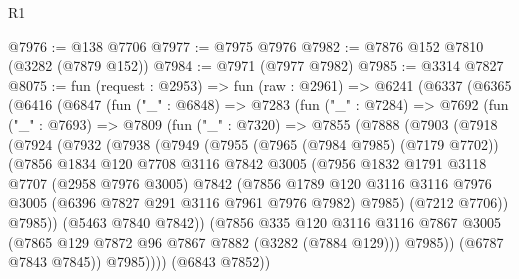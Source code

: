 \begin{lexlean}{R1}
\begin{coremodule}
@7976 := @138 @7706
@7977 := @7975 @7976
@7982 := @7876 @152 @7810 (@3282 (@7879 @152))
@7984 := @7971 (@7977 @7982)
@7985 := @3314 @7827
@8075 := fun (request : @2953) =>
  fun (raw : @2961) =>
  @6241
    (@6337
      (@6365
        (@6416
          (@6847
            (fun ("_" : @6848) =>
            @7283
              (fun ("_" : @7284) =>
              @7692
                (fun ("_" : @7693) =>
                @7809
                  (fun ("_" : @7320) =>
                  @7855
                    (@7888
                      (@7903
                        (@7918
                          (@7924
                            (@7932
                              (@7938
                                (@7949
                                  (@7955
                                    (@7965 (@7984 @7985) (@7179 @7702))
                                    (@7856
                                      @1834
                                      @120
                                      @7708
                                      @3116
                                      @7842
                                      @3005
                                      (@7956
                                        @1832
                                        @1791
                                        @3118
                                        @7707
                                        (@2958 @7976 @3005)
                                        @7842
                                        (@7856
                                          @1789
                                          @120
                                          @3116
                                          @3116
                                          @7976
                                          @3005
                                          (@6396 @7827 @291 @3116 @7961 @7976 @7982)
                                          @7985)
                                        (@7212 @7706))
                                      @7985))
                                  (@5463 @7840 @7842))
                                (@7856
                                  @335
                                  @120
                                  @3116
                                  @3116
                                  @7867
                                  @3005
                                  (@7865 @129 @7872 @96 @7867 @7882 (@3282 (@7884 @129)))
                                  @7985))
                              (@6787 @7843 @7845))
                            @7985))))
                    (@6843 @7852))

\end{coremodule}
\end{lexlean}

